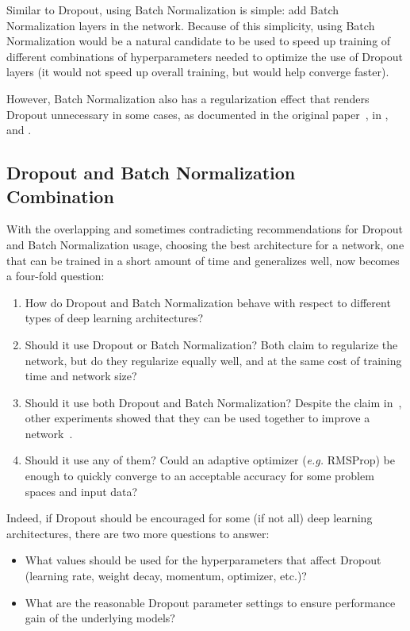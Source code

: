 \documentclass[../dropout-vs-batch-normalization.tex]{subfiles}
\begin{document}
Similar to Dropout, using Batch Normalization is simple: add Batch Normalization layers in the network. Because of this simplicity, using Batch Normalization would be a natural candidate to be used to speed up training of different combinations of hyperparameters needed to optimize the use of Dropout layers (it would not speed up overall training, but would help converge faster).

However, Batch Normalization also has a regularization effect that renders Dropout unnecessary in some cases, as documented in the original paper~\cite{Ioffe2015}, in \cite{Luo2018}, and \cite{Kohler2018}.

\subsection{Dropout and Batch Normalization Combination}

With the overlapping and sometimes contradicting recommendations for Dropout and Batch Normalization usage, choosing the best architecture for a network, one that can be trained in a short amount of time and generalizes well, now becomes a four-fold question:

\begin{enumerate}
\item How do Dropout and Batch Normalization behave with respect to different types of deep learning architectures?
\item Should it use Dropout or Batch Normalization? Both claim to regularize the network, but do they regularize equally well, and at the same cost of training time and network size?
\item Should it use both Dropout and Batch Normalization? Despite the claim in~\cite{Ioffe2015}, other experiments showed that they can be used together to improve a network~\cite{Li2018}.
\item Should it use any of them? Could an adaptive optimizer (\textit{e.g.} RMSProp) be enough to quickly converge to an acceptable accuracy for some problem spaces and input data?
\end{enumerate}

Indeed, if Dropout should be encouraged for some (if not all) deep learning architectures, there are two more questions to answer:

\begin{itemize}
\item What values should be used for the hyperparameters that affect Dropout (learning rate, weight decay, momentum, optimizer, etc.)?
\item What are the reasonable Dropout parameter settings to ensure performance gain of the underlying models?
\end{itemize}
\end{document}
